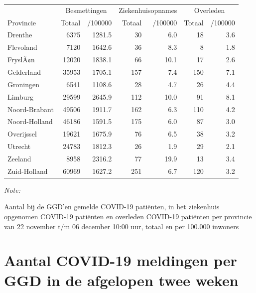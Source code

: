\documentclass[
  english,
  man,floatsintext]{apa6}
\begin{document}
\begin{table}
\centering
\begin{threeparttable}
\begin{tabular}{lrrrrrr}
\toprule
\multicolumn{1}{c}{ } & \multicolumn{2}{c}{Besmettingen} & \multicolumn{2}{c}{Ziekenhuisopnames} & \multicolumn{2}{c}{Overleden} \\
\cmidrule(l{3pt}r{3pt}){2-3} \cmidrule(l{3pt}r{3pt}){4-5} \cmidrule(l{3pt}r{3pt}){6-7}
Provincie & Totaal & /100000 & Totaal & /100000 & Totaal & /100000\\
\midrule
Drenthe & 6375 & 1281.5 & 30 & 6.0 & 18 & 3.6\\
Flevoland & 7120 & 1642.6 & 36 & 8.3 & 8 & 1.8\\
FryslÃ¢n & 12020 & 1838.1 & 66 & 10.1 & 17 & 2.6\\
Gelderland & 35953 & 1705.1 & 157 & 7.4 & 150 & 7.1\\
Groningen & 6541 & 1108.6 & 28 & 4.7 & 26 & 4.4\\
Limburg & 29599 & 2645.9 & 112 & 10.0 & 91 & 8.1\\
Noord-Brabant & 49506 & 1911.7 & 162 & 6.3 & 110 & 4.2\\
Noord-Holland & 46186 & 1591.5 & 175 & 6.0 & 87 & 3.0\\
Overijssel & 19621 & 1675.9 & 76 & 6.5 & 38 & 3.2\\
Utrecht & 24783 & 1812.3 & 26 & 1.9 & 29 & 2.1\\
Zeeland & 8958 & 2316.2 & 77 & 19.9 & 13 & 3.4\\
Zuid-Holland & 60969 & 1627.2 & 251 & 6.7 & 120 & 3.2\\
\bottomrule
\end{tabular}
\begin{tablenotes}
\item \textit{Note: } 
\item Aantal bij de GGD’en gemelde COVID-19 patiënten, in het ziekenhuis opgenomen COVID-19 patiënten en overleden COVID-19 patiënten per provincie van 22 november t/m 06 december 10:00 uur, totaal en per 100.000 inwoners
\end{tablenotes}
\end{threeparttable}
\end{table}

\newpage

\hypertarget{aantal-covid-19-meldingen-per-ggd-in-de-afgelopen-twee-weken}{%
\section{Aantal COVID-19 meldingen per GGD in de afgelopen twee weken}\label{aantal-covid-19-meldingen-per-ggd-in-de-afgelopen-twee-weken}}
\end{document}
